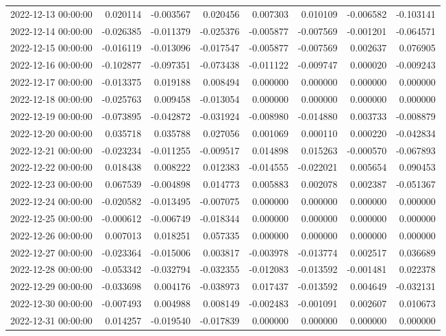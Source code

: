 \begin{tabular}{lrrrrrrr}
2022-12-13 00:00:00 & 0.020114 & -0.003567 & 0.020456 & 0.007303 & 0.010109 & -0.006582 & -0.103141 \\
2022-12-14 00:00:00 & -0.026385 & -0.011379 & -0.025376 & -0.005877 & -0.007569 & -0.001201 & -0.064571 \\
2022-12-15 00:00:00 & -0.016119 & -0.013096 & -0.017547 & -0.005877 & -0.007569 & 0.002637 & 0.076905 \\
2022-12-16 00:00:00 & -0.102877 & -0.097351 & -0.073438 & -0.011122 & -0.009747 & 0.000020 & -0.009243 \\
2022-12-17 00:00:00 & -0.013375 & 0.019188 & 0.008494 & 0.000000 & 0.000000 & 0.000000 & 0.000000 \\
2022-12-18 00:00:00 & -0.025763 & 0.009458 & -0.013054 & 0.000000 & 0.000000 & 0.000000 & 0.000000 \\
2022-12-19 00:00:00 & -0.073895 & -0.042872 & -0.031924 & -0.008980 & -0.014880 & 0.003733 & -0.008879 \\
2022-12-20 00:00:00 & 0.035718 & 0.035788 & 0.027056 & 0.001069 & 0.000110 & 0.000220 & -0.042834 \\
2022-12-21 00:00:00 & -0.023234 & -0.011255 & -0.009517 & 0.014898 & 0.015263 & -0.000570 & -0.067893 \\
2022-12-22 00:00:00 & 0.018438 & 0.008222 & 0.012383 & -0.014555 & -0.022021 & 0.005654 & 0.090453 \\
2022-12-23 00:00:00 & 0.067539 & -0.004898 & 0.014773 & 0.005883 & 0.002078 & 0.002387 & -0.051367 \\
2022-12-24 00:00:00 & -0.020582 & -0.013495 & -0.007075 & 0.000000 & 0.000000 & 0.000000 & 0.000000 \\
2022-12-25 00:00:00 & -0.000612 & -0.006749 & -0.018344 & 0.000000 & 0.000000 & 0.000000 & 0.000000 \\
2022-12-26 00:00:00 & 0.007013 & 0.018251 & 0.057335 & 0.000000 & 0.000000 & 0.000000 & 0.000000 \\
2022-12-27 00:00:00 & -0.023364 & -0.015006 & 0.003817 & -0.003978 & -0.013774 & 0.002517 & 0.036689 \\
2022-12-28 00:00:00 & -0.053342 & -0.032794 & -0.032355 & -0.012083 & -0.013592 & -0.001481 & 0.022378 \\
2022-12-29 00:00:00 & -0.033698 & 0.004176 & -0.038973 & 0.017437 & -0.013592 & 0.004649 & -0.032131 \\
2022-12-30 00:00:00 & -0.007493 & 0.004988 & 0.008149 & -0.002483 & -0.001091 & 0.002607 & 0.010673 \\
2022-12-31 00:00:00 & 0.014257 & -0.019540 & -0.017839 & 0.000000 & 0.000000 & 0.000000 & 0.000000 \\

\end{tabular}
